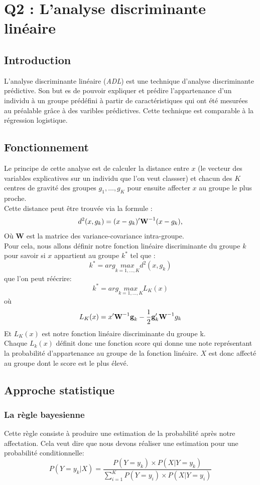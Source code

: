 \section*{Q2 : L'analyse discriminante linéaire}
\subsection{Introduction}
L'analyse discriminante linéaire (\emph{ADL}) est une technique d'analyse discriminante prédictive. Son but es de pouvoir expliquer et prédire l'appartenance d'un individu à un groupe prédéfini à partir de caractéristiques qui ont été mesurées au préalable grâce à des varibles prédictives. Cette technique est comparable à la régression logistique.
\subsection{Fonctionnement}
Le principe de cette analyse est de calculer la distance entre $x$ (le vecteur des variables explicatives sur un individu que l'on veut classser) et chacun des $K$ centres de gravité des groupes $g_1,\ldots,g_K$ pour ensuite affecter $x$ au groupe le plus proche.\\
Cette distance peut être trouvée via la formule :
\[
	d^2(x,g_k) = (x - g_k)'\text{\bf W}^{-1}(x - g_k)\text{,}
\]
Où {\bf W} est la matrice des variance-covariance intra-groupe.\\
Pour cela, nous allons définir notre fonction linéaire discriminante du groupe $k$ pour savoir si $x$ appartient au groupe $k^*$ tel que :
\[
	k^* = arg \underset{k = 1,...,K}{max} d^2(x,g_k)
\]
que l'on peut réécrire:
\[
	k^* = arg \underset{k = 1,...,K}{max} L_K(x)
\]
où 
\[
	L_K(x) = x'\text{\bf W}^{-1}\text{\bf g}_k - \frac{1}{2}\text{\bf g}'_k\text{\bf W}^{-1}g_k
\]
Et $L_K(x)$ est notre fonction linéaire discriminante du groupe k.\\
Chaque $L_k(x)$ définit donc une fonction score qui donne une note représentant la probabilité d'appartenance au groupe de la fonction linéaire. $X$ est donc affecté au groupe dont le score est le plus élevé.
\subsection{Approche statistique}
\subsubsection{La règle bayesienne}
	Cette règle consiste à produire une estimation de la probabilité après notre affectation.
	Cela veut dire que nous devons réaliser une estimation pour une probabilité conditionnelle:
	\[
	P(Y = y_k | X) = \frac{P(Y = y_k) \times P(X| Y = y_k)}{\sum_{i=1}^{K} P(Y = y_i)\times P(X|Y = y_i)}
	\]
	
